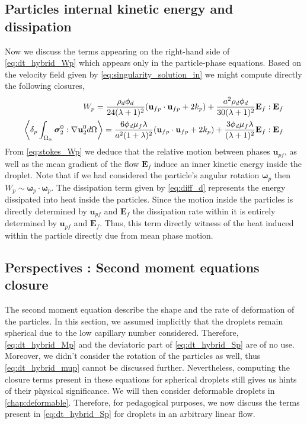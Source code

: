 \subsection{Particles internal kinetic energy and dissipation}
Now we discuss the terms appearing on the right-hand side of \ref{eq:dt_hybrid_Wp} which appears only in the particle-phase equations. 
Based on the velocity field given by \ref{eq:singularity_solution_in} we might compute directly the following closures,
\begin{align}
    \label{eq:stokes_Wp}
    W_p =  \frac{\rho_d \phi_d}{24 (\lambda +1)^2}
    (\textbf{u}_{fp} \cdot \textbf{u}_{fp} + 2 k_p)
    + \frac{a^2 \rho_d \phi_d}{30(\lambda+1)^2}
    \textbf{E}_f:\textbf{E}_f    \\
    \pOavg{\bm{\sigma}_2^0:\grad \textbf{u}_2^0}
    = 
    \frac{6 \phi_d \mu_f \lambda}{a^2(1+\lambda)^2}
    (\textbf{u}_{fp}\cdot \textbf{u}_{fp} + 2k_p)
    + \frac{3 \phi_d \mu_f \lambda}{(\lambda+1)^2}\textbf{E}_f:\textbf{E}_f
    \label{eq:diff_d}
\end{align}
From \ref{eq:stokes_Wp} we deduce that the relative motion between phases $\textbf{u}_{pf}$, as well as the mean gradient of the flow $\textbf{E}_f$ induce an inner kinetic energy inside the droplet. 
Note that if we had considered the particle's angular rotation $\bm\omega_p$ then $W_p \sim \bm\omega_p\cdot \bm\omega_p$. 
The dissipation term given by \ref{eq:diff_d} represents the energy dissipated into heat inside the particles. 
Since the motion inside the particles is directly determined by $\textbf{u}_{pf}$ and $\textbf{E}_f$ the dissipation rate within it is entirely determined by $\textbf{u}_{pf}$ and $\textbf{E}_f$. 
Thus, this term directly witness of the heat induced within the particle directly due from mean phase motion. 

\subsection{Perspectives : Second moment equations closure}

The second moment equation describe the shape and the rate of deformation of the particles.
In this section, we assumed implicitly that the droplets remain spherical due to the low capillary number considered. 
Therefore, \ref{eq:dt_hybrid_Mp} and the deviatoric part of \ref{eq:dt_hybrid_Sp} are of no use. 
Moreover, we didn't consider the rotation of the particles as well, thus \ref{eq:dt_hybrid_mup} cannot be discussed further. 
Nevertheless, computing the closure terms present in these equations for spherical droplets still gives us hints of their physical significance.
We will then consider deformable droplets in \ref{chap:deformable}.
Therefore, for pedagogical purposes, we now discuss the terms present in \ref{eq:dt_hybrid_Sp} for droplets in an arbitrary linear flow. 


